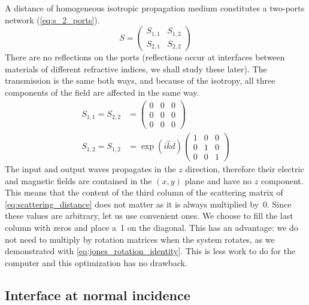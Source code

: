 A distance of homogeneous isotropic propagation medium constitutes a two-ports network (\cref{eq:s_2_ports}).
\begin{equation}
    S =
    \begin{pmatrix}
        S_{1, 1} & S_{1, 2} \\
        S_{2, 1} & S_{2, 2}
    \end{pmatrix}
    \label{eq:s_2_ports}
\end{equation}
There are no reflections on the ports (reflections occur at interfaces between materials of different refractive indices, we shall study these later).
The transmission is the same both ways, and because of the isotropy, all three components of the field are affected in the same way.
\begin{equation}
    \begin{aligned}
    S_{1, 1} = S_{2, 2} &=
    \begin{pmatrix}
        0 & 0 & 0 \\
        0 & 0 & 0 \\
        0 & 0 & 0
    \end{pmatrix}
    \\ 
    S_{1, 2} = S_{1, 2} &=
    \exp(i \hat{k} d)
    \begin{pmatrix}
        1 & 0 & 0 \\
        0 & 1 & 0 \\
        0 & 0 & 1
    \end{pmatrix}
    \end{aligned}
    \label{eq:scattering_distance}
\end{equation}
The input and output waves propagates in the $z$ direction, therefore their electric and magnetic fields are contained in the $(x, y)$ plane and have no $z$ component.
This means that the content of the third column of the scattering matrix of \cref{eq:scattering_distance} does not matter as it is always multiplied by~0.
Since these values are arbitrary, let us use convenient ones.
We choose to fill the last column with zeros and place a~1 on the diagonal. 
This has an advantage: we do not need to multiply by rotation matrices when the system rotates, as we demonstrated with \vref{eq:jones_rotation_identity}.
This is less work to do for the computer and this optimization has no drawback.



\subsection{Interface at normal incidence}
\label{sec:generic_networks_interface_at_normal_incidence}

